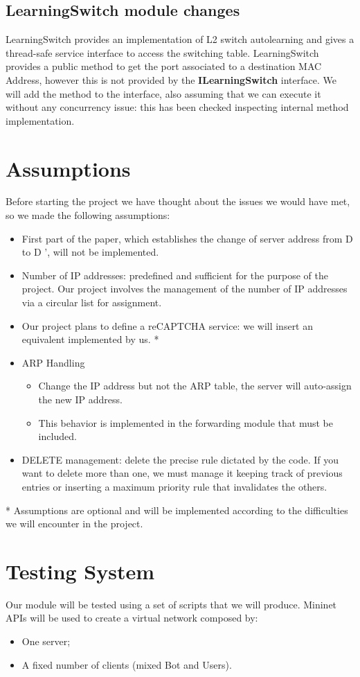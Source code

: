 \subsection{LearningSwitch module changes}
LearningSwitch provides an implementation of L2 switch autolearning and gives a thread-safe service interface to access the switching table. LearningSwitch provides a public method to get the port associated to a destination MAC Address, however this is not provided by the \textbf{ILearningSwitch} interface.
We will add the method to the interface, also assuming that we can execute it without any concurrency issue: this has been checked inspecting internal method implementation.

\section{Assumptions}
Before starting the project we have thought about the issues we would have met, so we made the following assumptions:
\begin{itemize}
	\item First part of the paper, which establishes the change of server address from D to D ', will not be implemented.
	\item Number of IP addresses: predefined and sufficient for the purpose of the project. Our project involves the management of the number of IP addresses via a circular list for assignment. 
	\item Our project plans to define a reCAPTCHA service: we will insert an equivalent implemented by us. *
	\item ARP Handling 
		\begin{itemize}
			\item Change the IP address but not the ARP table, the server will auto-assign the new IP address.
			\item This behavior is implemented in the forwarding module that must be included.
		\end{itemize}
	\item DELETE management: delete the precise rule dictated by the code. If you want to delete more than one, we must manage it keeping track of previous entries or inserting a maximum priority rule that invalidates the others.
\end{itemize}
* Assumptions are optional and will be implemented according to the difficulties we will encounter in the project.

\section{Testing System}
Our module will be tested using a set of scripts that we will produce. Mininet APIs will be used to create a virtual network composed by:
\begin{itemize}
	\item One server;
	\item A fixed number of clients (mixed Bot and Users).
\end{itemize}

